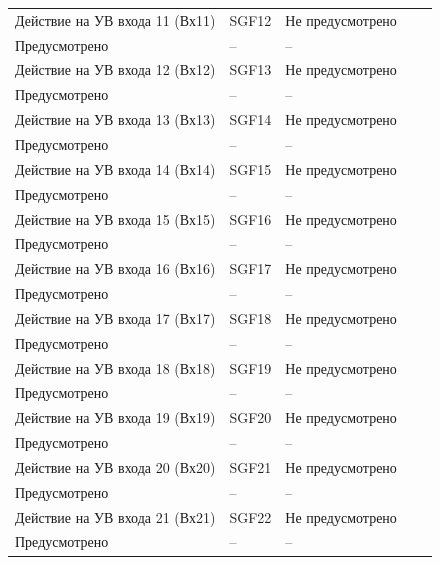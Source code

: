 \begin{longtable}{|>{\centering\arraybackslash}m{5.3cm}|>{\centering\arraybackslash}m{3.3cm}|>{\centering\arraybackslash}m{4.2cm}|>{\centering\arraybackslash}m{1.8cm}|>{\centering\arraybackslash}m{1cm}|}
\hline
\centering Действие на УВ входа 11 (Вх11)  & \centering SGF12 & \centering Не предусмотрено \\ Предусмотрено & \centering -- & \centering \arraybackslash -- \\
\hline
\centering Действие на УВ входа 12 (Вх12)  & \centering SGF13 & \centering Не предусмотрено \\ Предусмотрено & \centering -- & \centering \arraybackslash -- \\
\hline
\centering Действие на УВ входа 13 (Вх13)  & \centering SGF14 & \centering Не предусмотрено \\ Предусмотрено & \centering -- & \centering \arraybackslash -- \\
\hline
\centering Действие на УВ входа 14 (Вх14)  & \centering SGF15 & \centering Не предусмотрено \\ Предусмотрено & \centering -- & \centering \arraybackslash -- \\
\hline
\centering Действие на УВ входа 15 (Вх15)  & \centering SGF16 & \centering Не предусмотрено \\ Предусмотрено & \centering -- & \centering \arraybackslash -- \\
\hline
\centering Действие на УВ входа 16 (Вх16)  & \centering SGF17 & \centering Не предусмотрено \\ Предусмотрено & \centering -- & \centering \arraybackslash -- \\
\hline
\centering Действие на УВ входа 17 (Вх17)  & \centering SGF18 & \centering Не предусмотрено \\ Предусмотрено & \centering -- & \centering \arraybackslash -- \\
\hline
\centering Действие на УВ входа 18 (Вх18)  & \centering SGF19 & \centering Не предусмотрено \\ Предусмотрено & \centering -- & \centering \arraybackslash -- \\
\hline
\centering Действие на УВ входа 19 (Вх19)  & \centering SGF20 & \centering Не предусмотрено \\ Предусмотрено & \centering -- & \centering \arraybackslash -- \\
\hline
\centering Действие на УВ входа 20 (Вх20)  & \centering SGF21 & \centering Не предусмотрено \\ Предусмотрено & \centering -- & \centering \arraybackslash -- \\
\hline
\centering Действие на УВ входа 21 (Вх21)  & \centering SGF22 & \centering Не предусмотрено \\ Предусмотрено & \centering -- & \centering \arraybackslash -- \\

\end{longtable}
